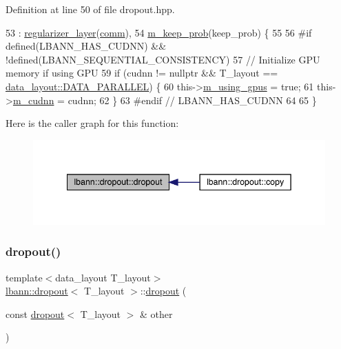 Definition at line 50 of file dropout.\+hpp.


\begin{DoxyCode}
53     : \hyperlink{classlbann_1_1regularizer__layer_a2ebf3877b905b479a0250b74cf8f68b3}{regularizer\_layer}(\hyperlink{file__io_8cpp_ab048c6f9fcbcfaa57ce68b00263dbebe}{comm}),
54       \hyperlink{classlbann_1_1dropout_aa06cbee70f3426b589990889b8ac8872}{m\_keep\_prob}(keep\_prob) \{
55 
56 \textcolor{preprocessor}{  #if defined(LBANN\_HAS\_CUDNN) && !defined(LBANN\_SEQUENTIAL\_CONSISTENCY)}
57     \textcolor{comment}{// Initialize GPU memory if using GPU}
59 \textcolor{comment}{}    \textcolor{keywordflow}{if} (cudnn != \textcolor{keyword}{nullptr} && T\_layout == \hyperlink{base_8hpp_a786677cbfb3f5677b4d84f3056eb08dba37d2a3465f7cbf4ab60f4e79944d0638}{data\_layout::DATA\_PARALLEL}) \{
60       this->\hyperlink{classlbann_1_1Layer_af7881cb5eff5207c15fa835d65462e8f}{m\_using\_gpus} = \textcolor{keyword}{true};
61       this->\hyperlink{classlbann_1_1Layer_a08dbb94239e3b8c96329786c57c72e21}{m\_cudnn} = cudnn;
62     \}
63 \textcolor{preprocessor}{  #endif // LBANN\_HAS\_CUDNN}
64     
65   \}
\end{DoxyCode}
Here is the caller graph for this function\+:\nopagebreak
\begin{figure}[H]
\begin{center}
\leavevmode
\includegraphics[width=342pt]{classlbann_1_1dropout_a301be902f285c5cf1d0cd743119a09d8_icgraph}
\end{center}
\end{figure}
\mbox{\label{classlbann_1_1dropout_ab2057d4abf48b96f8f6e9f64bdb0fc7e}} 
\subsubsection{\texorpdfstring{dropout()}{dropout()}\hspace{0.1cm}{\footnotesize\ttfamily [2/2]}}
{\footnotesize\ttfamily template$<$data\+\_\+layout T\+\_\+layout$>$ \\
\hyperlink{classlbann_1_1dropout}{lbann\+::dropout}$<$ T\+\_\+layout $>$\+::\hyperlink{classlbann_1_1dropout}{dropout} (\begin{DoxyParamCaption}\item[{const \hyperlink{classlbann_1_1dropout}{dropout}$<$ T\+\_\+layout $>$ \&}]{other }\end{DoxyParamCaption})\hspace{0.3cm}{\ttfamily [inline]}}



